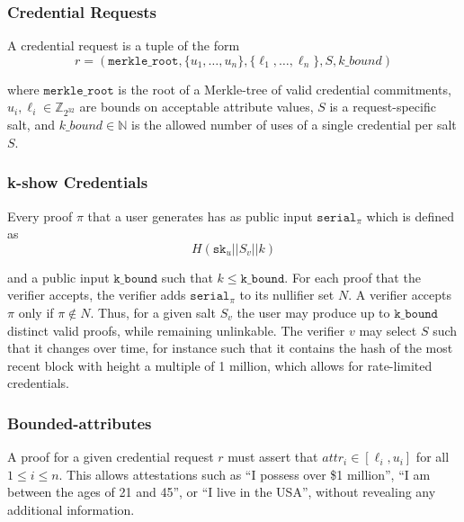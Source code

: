 \documentclass[11 pt]{extarticle}
\newcommand{\N}{\mathbb{N}}
\newcommand{\Z}{\mathbb{Z}}
\theoremstyle{remark}
\begin{document}
\subsubsection{Credential Requests}
A credential request is a tuple of the form
\begin{equation*}
  r = (\texttt{merkle\_root}, \{u_1, \dots,u_n\}, \{\ell_1,\dots,\ell_n\}, S, k\_bound)
\end{equation*}

where $\texttt{merkle\_root}$ is the root of a Merkle-tree of valid credential
commitments, $u_i, \ell_i \in \Z_{2^{32}}$ are bounds on acceptable attribute
values, $S$ is a request-specific salt, and $k\_bound\in \N$ is the allowed number of
uses of a single credential per salt $S$.

\subsubsection{k-show Credentials}
Every proof $\pi$ that a user generates has as public input
$\texttt{serial}_\pi$ which is defined as
\begin{equation*}
  H(\texttt{sk}_u || S_v || k)
\end{equation*}

and a public input $\texttt{k\_bound}$ such that $k\leq \texttt{k\_bound}$. For
each proof that the verifier accepts, the verifier adds $\texttt{serial}_\pi$ to
its nullifier set $N$. A verifier accepts $\pi$ only if $\pi \notin N$. Thus,
for a given salt $S_v$ the user may produce up to $\texttt{k\_bound}$ distinct
valid proofs, while remaining unlinkable. The verifier $v$ may select $S$ such
that it changes over time, for instance such that it contains the hash of the
most recent block with height a multiple of 1 million, which allows for
rate-limited credentials.

\subsubsection{Bounded-attributes}
A proof for a given credential request $r$ must assert that $attr_i \in [\ell_i,
u_i]$ for all $1\leq i\leq n$. This allows attestations such as ``I possess over
\$1 million'', ``I am between the ages of 21 and 45'', or ``I live in the USA'',
without revealing any additional information.
\end{document}
